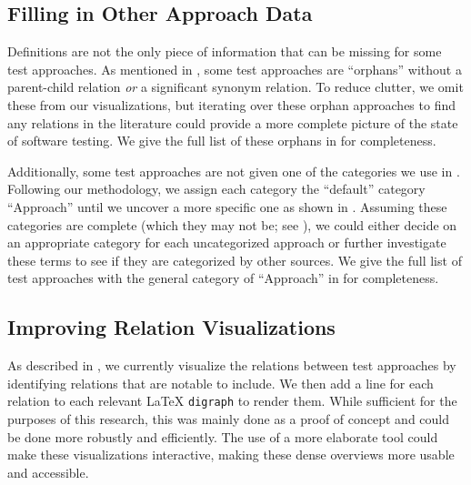 \subsection{Filling in Other Approach Data}\label{future-app-data}
Definitions are not the only piece of information that can be missing for some
test approaches. As mentioned in , some test approaches are
``orphans'' without a parent-child relation \emph{or} a significant synonym
relation. To reduce clutter, we omit these from our visualizations, but
iterating over these orphan approaches to find any relations in the literature
could provide a more complete picture of the state of software testing.%
 We give the
full list of these orphans in  for completeness.

Additionally, some test approaches are not given one of the categories we use
in . Following our methodology, we assign each category the
``default'' category ``Approach'' until we uncover a more specific one as
shown in . Assuming these categories are complete
(which they may not be; see ), we could either decide on an
appropriate category for each uncategorized approach or further investigate
these terms to see if they are categorized by other sources. We give the
full list of test approaches with the general category of ``Approach'' in
 for completeness.

\subsection{Improving Relation Visualizations}\label{future-rel-vis}
As described in , we currently visualize the relations
between test approaches by identifying relations that are notable to include.
We then add a line for each relation to each relevant \LaTeX{}
\texttt{digraph} to render them. While sufficient for the purposes of this
research, this was mainly done as a proof of concept and
could be done more robustly and efficiently. The use of a more elaborate tool
could make these visualizations interactive, making these dense overviews more
usable and accessible.

